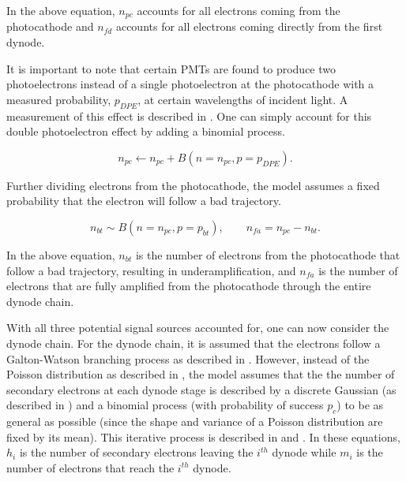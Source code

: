 In the above equation, $n_{pc}$ accounts for all electrons coming from the photocathode and $n_{fd}$ accounts for all electrons coming directly from the first dynode.


It is important to note that certain PMTs are found to produce two photoelectrons instead of a single photoelectron at the photocathode with a measured probability, $p_{DPE}$, at certain wavelengths of incident light.  A measurement of this effect is described in .  One can simply account for this double photoelectron effect by adding a binomial process.

\begin{equation}
        n_{pc} \leftarrow n_{pc} + B(n=n_{pc}, p=p_{DPE}).
\end{equation}

Further dividing electrons from the photocathode, the model assumes a fixed probability that the electron will follow a bad trajectory.


\begin{equation}
n_{bt} \sim B(n=n_{pc}, p=p_{bt}), \qquad
n_{fa} = n_{pc} - n_{bt}.
\end{equation}

In the above equation, $n_{bt}$ is the number of electrons from the photocathode that follow a bad trajectory, resulting in underamplification, and $n_{fa}$ is the number of electrons that are fully amplified from the photocathode through the entire dynode chain.


With all three potential signal sources accounted for, one can now consider the dynode chain.  For the dynode chain, it is assumed that the electrons follow a Galton-Watson branching process as described in .  However, instead of the Poisson distribution as described in , the model assumes that the the number of secondary electrons at each dynode stage is described by a discrete Gaussian (as described in ) and a binomial process (with probability of success $p_c$) to be as general as possible (since the shape and variance of a Poisson distribution are fixed by its mean).  This iterative process is described in  and .  In these equations, $h_{i}$ is the number of secondary electrons leaving the $i^{th}$ dynode while $m_{i}$ is the number of electrons that reach the $i^{th}$ dynode.

